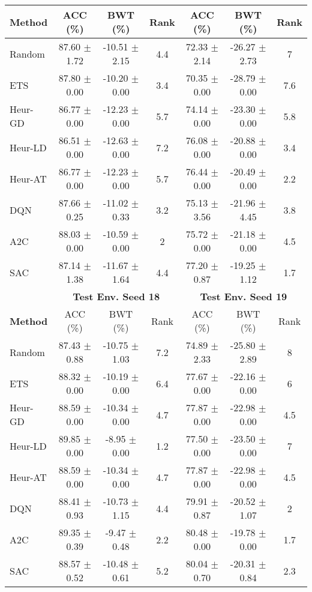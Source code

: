 \begin{tabular}{lcccccc}
	\cmidrule(lr){2-4} \cmidrule(lr){5-7}
	\textbf{Method} & ACC (\%)          & BWT (\%)          & Rank   & ACC (\%)          & BWT (\%)          & Rank   \\
	\midrule 
	Random          & 87.60 $\pm$ 1.72    & -10.51 $\pm$ 2.15   & 4.4    & 72.33 $\pm$ 2.14    & -26.27 $\pm$ 2.73   & 7      \\
	ETS             & 87.80 $\pm$ 0.00    & -10.20 $\pm$ 0.00   & 3.4    & 70.35 $\pm$ 0.00    & -28.79 $\pm$ 0.00   & 7.6    \\
	Heur-GD         & 86.77 $\pm$ 0.00    & -12.23 $\pm$ 0.00   & 5.7    & 74.14 $\pm$ 0.00    & -23.30 $\pm$ 0.00   & 5.8    \\
	Heur-LD         & 86.51 $\pm$ 0.00    & -12.63 $\pm$ 0.00   & 7.2    & 76.08 $\pm$ 0.00    & -20.88 $\pm$ 0.00   & 3.4    \\
	Heur-AT         & 86.77 $\pm$ 0.00    & -12.23 $\pm$ 0.00   & 5.7    & 76.44 $\pm$ 0.00    & -20.49 $\pm$ 0.00   & 2.2    \\
	DQN             & 87.66 $\pm$ 0.25    & -11.02 $\pm$ 0.33   & 3.2    & 75.13 $\pm$ 3.56    & -21.96 $\pm$ 4.45   & 3.8    \\
	A2C             & 88.03 $\pm$ 0.00    & -10.59 $\pm$ 0.00   & 2      & 75.72 $\pm$ 0.00    & -21.18 $\pm$ 0.00   & 4.5    \\
	SAC             & 87.14 $\pm$ 1.38    & -11.67 $\pm$ 1.64   & 4.4    & 77.20 $\pm$ 0.87    & -19.25 $\pm$ 1.12   & 1.7    \\
	\midrule 
	& \multicolumn{3}{c}{\textbf{Test Env. Seed 18}} & \multicolumn{3}{c}{\textbf{Test Env. Seed 19}} \\
	\cmidrule(lr){2-4} \cmidrule(lr){5-7}
	\textbf{Method} & ACC (\%)          & BWT (\%)          & Rank   & ACC (\%)          & BWT (\%)          & Rank   \\
	\midrule 
	Random          & 87.43 $\pm$ 0.88    & -10.75 $\pm$ 1.03   & 7.2    & 74.89 $\pm$ 2.33    & -25.80 $\pm$ 2.89   & 8      \\
	ETS             & 88.32 $\pm$ 0.00    & -10.19 $\pm$ 0.00   & 6.4    & 77.67 $\pm$ 0.00    & -22.16 $\pm$ 0.00   & 6      \\
	Heur-GD         & 88.59 $\pm$ 0.00    & -10.34 $\pm$ 0.00   & 4.7    & 77.87 $\pm$ 0.00    & -22.98 $\pm$ 0.00   & 4.5    \\
	Heur-LD         & 89.85 $\pm$ 0.00    & -8.95 $\pm$ 0.00    & 1.2    & 77.50 $\pm$ 0.00    & -23.50 $\pm$ 0.00   & 7      \\
	Heur-AT         & 88.59 $\pm$ 0.00    & -10.34 $\pm$ 0.00   & 4.7    & 77.87 $\pm$ 0.00    & -22.98 $\pm$ 0.00   & 4.5    \\
	DQN             & 88.41 $\pm$ 0.93    & -10.73 $\pm$ 1.15   & 4.4    & 79.91 $\pm$ 0.87    & -20.52 $\pm$ 1.07   & 2      \\
	A2C             & 89.35 $\pm$ 0.39    & -9.47 $\pm$ 0.48    & 2.2    & 80.48 $\pm$ 0.00    & -19.78 $\pm$ 0.00   & 1.7    \\
	SAC             & 88.57 $\pm$ 0.52    & -10.48 $\pm$ 0.61   & 5.2    & 80.04 $\pm$ 0.70    & -20.31 $\pm$ 0.84   & 2.3   \\
	\bottomrule
\end{tabular}